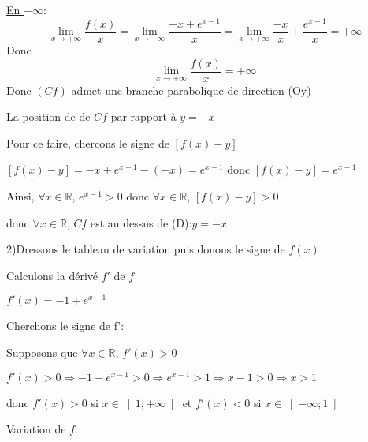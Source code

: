 \documentclass[12pt]{article}
\begin{document}
\underline{En $+\infty$}:
\[\lim_{x \to +\infty}\frac{f(x)}{x}=\lim_{x \to +\infty}\frac{-x+e^{x-1}}{x}=\lim_{x \to +\infty}\frac{-x}{x}+\frac{e^{x-1}}{x}=+\infty\]
Donc \[\lim_{x \to +\infty}\frac{f(x)}{x}=+\infty\] Donc $(Cf)$ admet une branche parabolique de direction (Oy)

La position de de $Cf$ par rapport à $y=-x$

Pour ce faire, chercons le signe de $\left[ f(x)-y\right] $

$\left[ f(x)-y\right]=-x+e^{x-1}-(-x)=e^{x-1}$ donc $\left[ f(x)-y\right]=e^{x-1}$

Ainsi, $\forall x \in \mathbb{R}$, $e^{x-1}>0$ donc $\forall x \in \mathbb{R}$, $\left[ f(x)-y\right]>0$

donc $\forall x \in \mathbb{R}$, $Cf$ est au dessus de (D):$y=-x$

2)Dressons le tableau de variation puis donons le signe de $f(x)$

Calculons la dérivé $f'$ de $f$

$f'(x)=-1+e^{x-1}$

Cherchons le signe de f':

Supposons que $\forall x \in \mathbb{R}$, $f'(x)>0$

$f'(x)>0 \Longrightarrow -1+e^{x-1}>0 \Longrightarrow e^{x-1}>1 \Longrightarrow x-1>0 \Longrightarrow x>1$ 

donc $f'(x)>0$ si $x\in\left]1; +\infty\right[ $ et $f'(x)<0$ si $x\in\left]-\infty; 1\right[ $

Variation de $f$:
\end{document}
